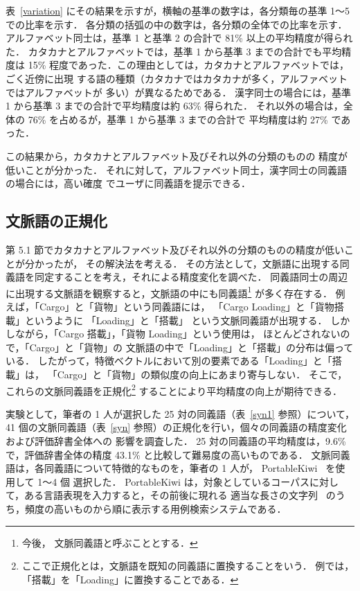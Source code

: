 \documentclass[japanese]{jnlp_1.4}
\begin{document}
表~\ref{variation} にその結果を示すが，横軸の基準の数字は，各分類毎の基準 1〜5 での比率を示す．
各分類の括弧の中の数字は，各分類の全体での比率を示す．
アルファベット同士は，基準 1 と基準 2 の合計で 81\% 以上の平均精度が得られた．
カタカナとアルファベットでは，基準 1 から基準 3 までの合計でも平均精度は 15\% 程度であった．この理由としては，カタカナとアルファベットでは，ごく近傍に出現
する語の種類（カタカナではカタカナが多く，アルファベットではアルファベットが
多い）が異なるためである．
漢字同士の場合には，基準 1 から基準 3 までの合計で平均精度は約 63\% 得られた．
それ以外の場合は，全体の 76\% を占めるが，基準 1 から基準 3 までの合計で
平均精度は約 27\% であった．

この結果から，カタカナとアルファベット及びそれ以外の分類のものの
精度が低いことが分かった．
それに対して，アルファベット同士，漢字同士の同義語の場合には，高い確度
でユーザに同義語を提示できる．




\subsection{文脈語の正規化}
\label{subsec:文脈語の正規化}

第 5.1 節でカタカナとアルファベット及びそれ以外の分類のものの精度が低いことが分かったが，
その解決法を考える．
その方法として，文脈語に出現する同義語を同定することを考え，それによる精度変化を調べた．
同義語同士の周辺に出現する文脈語を観察すると，文脈語の中にも同義語\footnote{
	今後，
	文脈同義語と呼ぶこととする．
} が多く存在する．
例えば，「Cargo」と「貨物」という同義語には，
「Cargo Loading」と「貨物搭載」というように
「Loading」と「搭載」
という文脈同義語が出現する．
しかしながら，「Cargo 搭載」，「貨物 Loading」という使用は，
ほとんどされないので，「Cargo」と「貨物」の
文脈語の中で「Loading」と「搭載」の分布は偏っている．
したがって，特徴ベクトルにおいて別の要素である「Loading」と「搭載」は，
「Cargo」と「貨物」の類似度の向上にあまり寄与しない．
そこで，これらの文脈同義語を正規化\footnote{
	ここで正規化とは，文脈語を既知の同義語に置換することをいう．
例では，「搭載」を「Loading」に置換することである．
	} することにより平均精度の向上が期待できる．

実験として，筆者の 1 人が選択した 25 対の同義語（表~\ref{syn1} 参照）について，
41 個の文脈同義語（表~\ref{syn} 参照）の正規化を行い，個々の同義語の精度変化および評価辞書全体への
影響を調査した．
25 対の同義語の平均精度は，9.6\% で，評価辞書全体の精度 43.1\% と比較して難易度の高いものである．
文脈同義語は，各同義語について特徴的なものを，筆者の 1 人が，
PortableKiwi~\cite{pkiwi} を使用して 1〜4 個
選択した．
PortableKiwi は，対象としているコーパスに対して，ある言語表現を入力すると，その前後に現れる
適当な長さの文字列~\cite{kiwi} のうち，頻度の高いものから順に表示する用例検索システムである．
\end{document}
